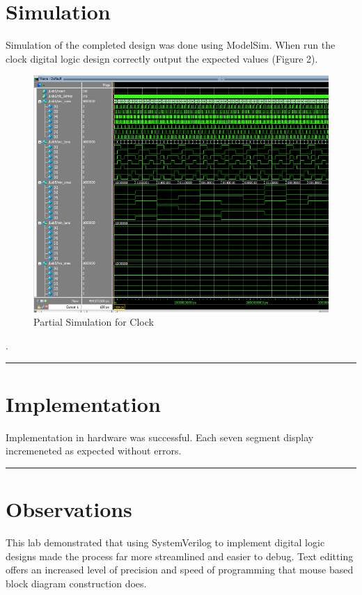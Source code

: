 \documentclass{article}
\begin{document}
\newpage

\section*{\textcolor{mycolor}{Simulation}}
Simulation of the completed design was done using ModelSim. When run the clock digital logic design correctly output the expected values (Figure 2). 

\begin{figure}[H]
  \centering
  \includegraphics[width=1\linewidth]{png/lab5_sim.png}
  \caption{Partial Simulation for Clock}  
\end{figure}.

\vspace{5mm}
\hrule

\section*{\textcolor{mycolor}{Implementation}}
Implementation in hardware was successful. Each seven segment display incremeneted as expected without errors.

\vspace{5mm}
\hrule

\section*{\textcolor{mycolor}{Observations}}

This lab demonstrated that using SystemVerilog to implement digital logic designs made the process far more streamlined and easier to debug. Text editting offers an increased level of precision and speed of programming that mouse based block diagram construction does.
\end{document}
